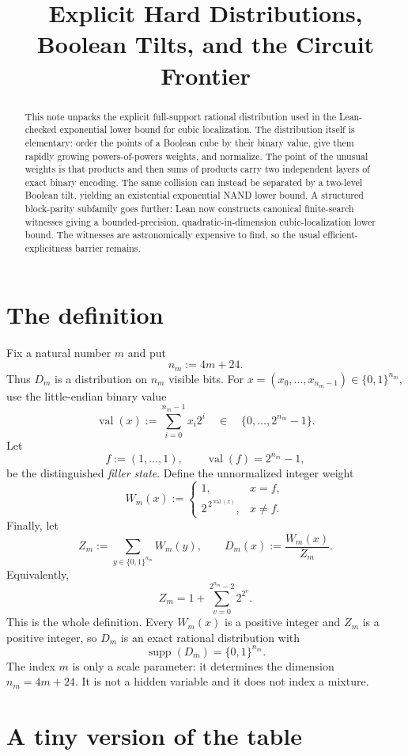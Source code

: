 \documentclass[11pt]{article}
\title{Explicit Hard Distributions, Boolean Tilts, and the Circuit Frontier}
\author{}
\date{}
\newcommand{\bits}{\{0,1\}}
\newcommand{\val}{\operatorname{val}}
\newcommand{\supp}{\operatorname{supp}}
\begin{document}
\maketitle

\begin{abstract}
This note unpacks the explicit full-support rational distribution used in the
Lean-checked exponential lower bound for cubic localization.  The distribution
itself is elementary: order the points of a Boolean cube by their binary value,
give them rapidly growing powers-of-powers weights, and normalize.  The point
of the unusual weights is that products and then sums of products carry two
independent layers of exact binary encoding.  The same collision can instead
be separated by a two-level Boolean tilt, yielding an existential exponential
NAND lower bound.  A structured block-parity subfamily goes further: Lean now
constructs canonical finite-search witnesses giving a bounded-precision,
quadratic-in-dimension cubic-localization lower bound.  The witnesses are
astronomically expensive to find, so the usual efficient-explicitness barrier
remains.
\end{abstract}

\section{The definition}

Fix a natural number $m$ and put
\[
  n_m := 4m+24.
\]
Thus $D_m$ is a distribution on $n_m$ visible bits.  For
$x=(x_0,\ldots,x_{n_m-1})\in\bits^{n_m}$, use the little-endian binary value
\[
  \val(x):=\sum_{i=0}^{n_m-1}x_i2^i
  \quad\in\quad\{0,\ldots,2^{n_m}-1\}.
\]
Let
\[
  f:=(1,\ldots,1),
  \qquad \val(f)=2^{n_m}-1,
\]
be the distinguished \emph{filler state}.  Define the unnormalized integer
weight
\[
  W_m(x):=
  \begin{cases}
    1, & x=f,\\[2mm]
    2^{\,2^{\val(x)}}, & x\ne f.
  \end{cases}
\]
Finally, let
\[
  Z_m:=\sum_{y\in\bits^{n_m}}W_m(y),
  \qquad
  D_m(x):=\frac{W_m(x)}{Z_m}.
\]
Equivalently,
\[
  Z_m=1+\sum_{v=0}^{2^{n_m}-2}2^{2^v}.
\]
This is the whole definition.  Every $W_m(x)$ is a positive integer and
$Z_m$ is a positive integer, so $D_m$ is an exact rational distribution with
\[
  \supp(D_m)=\bits^{n_m}.
\]
The index $m$ is only a scale parameter: it determines the dimension
$n_m=4m+24$.  It is not a hidden variable and it does not index a mixture.

\section{A tiny version of the table}
\end{document}
